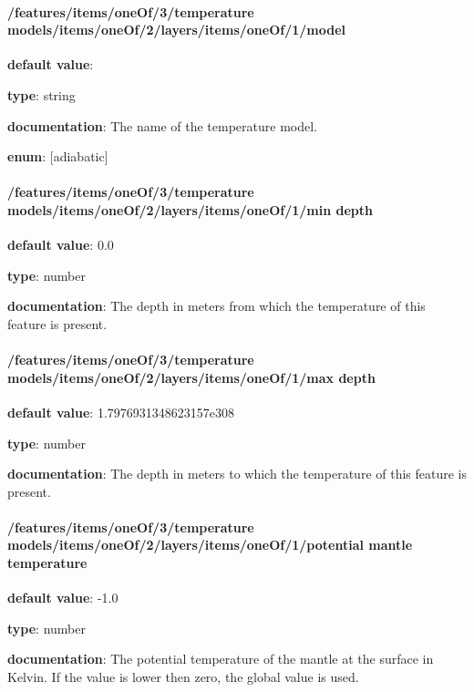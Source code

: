 \paragraph{/features/items/oneOf/3/temperature models/items/oneOf/2/layers/items/oneOf/1/model} \begin{itemized}
\item {\bf default value}: 
\item {\bf type}: string
\item {\bf documentation}: The name of the temperature model.
\item {\bf enum}: [adiabatic]\end{itemized}\paragraph{/features/items/oneOf/3/temperature models/items/oneOf/2/layers/items/oneOf/1/min depth} \begin{itemized}
\item {\bf default value}: 0.0
\item {\bf type}: number
\item {\bf documentation}: The depth in meters from which the temperature of this feature is present.
\end{itemized}\paragraph{/features/items/oneOf/3/temperature models/items/oneOf/2/layers/items/oneOf/1/max depth} \begin{itemized}
\item {\bf default value}: 1.7976931348623157e308
\item {\bf type}: number
\item {\bf documentation}: The depth in meters to which the temperature of this feature is present.
\end{itemized}\paragraph{/features/items/oneOf/3/temperature models/items/oneOf/2/layers/items/oneOf/1/potential mantle temperature} \begin{itemized}
\item {\bf default value}: -1.0
\item {\bf type}: number
\item {\bf documentation}: The potential temperature of the mantle at the surface in Kelvin. If the value is lower then zero, the global value is used.

\end{itemized}
